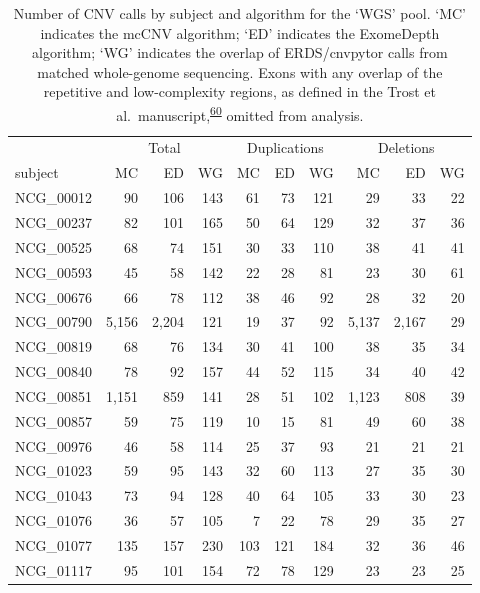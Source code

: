 \documentclass[11pt,letterpaper]{book}
\begin{document}
\begin{table}

\caption[Number of CNV calls by subject and algorithm for the 'WGS' pool.]{\label{tab:wgsCallSbj}Number of CNV calls by subject and algorithm for the `WGS' pool. `MC' indicates the mcCNV algorithm; `ED' indicates the ExomeDepth algorithm; `WG' indicates the overlap of ERDS/cnvpytor calls from matched whole-genome sequencing. Exons with any overlap of the repetitive and low-complexity regions, as defined in the Trost et al.~manuscript,\textsuperscript{\protect\hyperlink{ref-trost:2018aa}{60}} omitted from analysis.}
\centering
\begin{tabular}[t]{lrrrrrrrrr}
\toprule
\multicolumn{1}{c}{ } & \multicolumn{3}{c}{Total} & \multicolumn{3}{c}{Duplications} & \multicolumn{3}{c}{Deletions} \\
\cmidrule(l{3pt}r{3pt}){2-4} \cmidrule(l{3pt}r{3pt}){5-7} \cmidrule(l{3pt}r{3pt}){8-10}
subject & MC & ED & WG & MC & ED & WG & MC & ED & WG\\
\midrule
NCG\_00012 & 90 & 106 & 143 & 61 & 73 & 121 & 29 & 33 & 22\\
NCG\_00237 & 82 & 101 & 165 & 50 & 64 & 129 & 32 & 37 & 36\\
NCG\_00525 & 68 & 74 & 151 & 30 & 33 & 110 & 38 & 41 & 41\\
NCG\_00593 & 45 & 58 & 142 & 22 & 28 & 81 & 23 & 30 & 61\\
NCG\_00676 & 66 & 78 & 112 & 38 & 46 & 92 & 28 & 32 & 20\\
\addlinespace
NCG\_00790 & 5,156 & 2,204 & 121 & 19 & 37 & 92 & 5,137 & 2,167 & 29\\
NCG\_00819 & 68 & 76 & 134 & 30 & 41 & 100 & 38 & 35 & 34\\
NCG\_00840 & 78 & 92 & 157 & 44 & 52 & 115 & 34 & 40 & 42\\
NCG\_00851 & 1,151 & 859 & 141 & 28 & 51 & 102 & 1,123 & 808 & 39\\
NCG\_00857 & 59 & 75 & 119 & 10 & 15 & 81 & 49 & 60 & 38\\
\addlinespace
NCG\_00976 & 46 & 58 & 114 & 25 & 37 & 93 & 21 & 21 & 21\\
NCG\_01023 & 59 & 95 & 143 & 32 & 60 & 113 & 27 & 35 & 30\\
NCG\_01043 & 73 & 94 & 128 & 40 & 64 & 105 & 33 & 30 & 23\\
NCG\_01076 & 36 & 57 & 105 & 7 & 22 & 78 & 29 & 35 & 27\\
NCG\_01077 & 135 & 157 & 230 & 103 & 121 & 184 & 32 & 36 & 46\\
\addlinespace
NCG\_01117 & 95 & 101 & 154 & 72 & 78 & 129 & 23 & 23 & 25\\
\bottomrule
\end{tabular}
\end{table}
\end{document}

